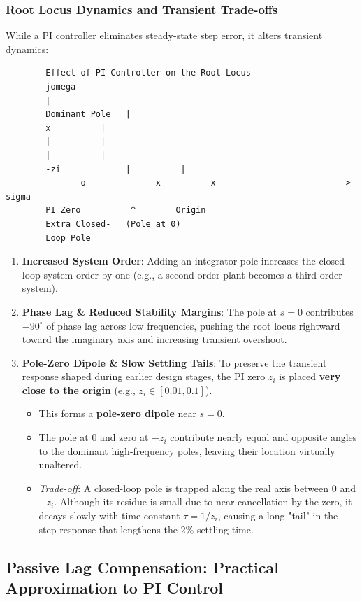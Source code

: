 \documentclass[12pt,onecolumn,twoside ]{article}
\begin{document}
	\subsubsection{Root Locus Dynamics and Transient Trade-offs}
	While a PI controller eliminates steady-state step error, it alters transient dynamics:
	\begin{lstlisting}
		Effect of PI Controller on the Root Locus
		jomega
		|
		Dominant Pole   |
		x          |
		|          |
		|          |
		-zi             |          |
		-------o--------------x----------x--------------------------> sigma
		PI Zero          ^        Origin
		Extra Closed-   (Pole at 0)
		Loop Pole
	\end{lstlisting}
	\begin{enumerate}
		\item
		\textbf{Increased System Order}: Adding an integrator pole increases the closed-loop system order by one (e.g., a second-order plant becomes a third-order system).
		\item
		\textbf{Phase Lag \& Reduced Stability Margins}: The pole at $s = 0$ contributes $-90^\circ$ of phase lag across low frequencies, pushing the root locus rightward toward the imaginary axis and increasing transient overshoot.
		\item
		\textbf{Pole-Zero Dipole \& Slow Settling Tails}: To preserve the transient response shaped during earlier design stages, the PI zero $z_i$ is placed \textbf{very close to the origin} (e.g., $z_i \in [0.01, 0.1]$).
		\begin{itemize}
			\item
			This forms a \textbf{pole-zero dipole} near $s = 0$.
			\item
			The pole at $0$ and zero at $-z_i$ contribute nearly equal and opposite angles to the dominant high-frequency poles, leaving their location virtually unaltered.
			\item
			\textit{Trade-off}: A closed-loop pole is trapped along the real axis between $0$ and $-z_i$. Although its residue is small due to near cancellation by the zero, it decays slowly with time constant $\tau = 1/z_i$, causing a long "tail" in the step response that lengthens the $2\%$ settling time.
		\end{itemize}
	\end{enumerate}
	
	\subsection{Passive Lag Compensation: Practical Approximation to PI Control}
\end{document}

